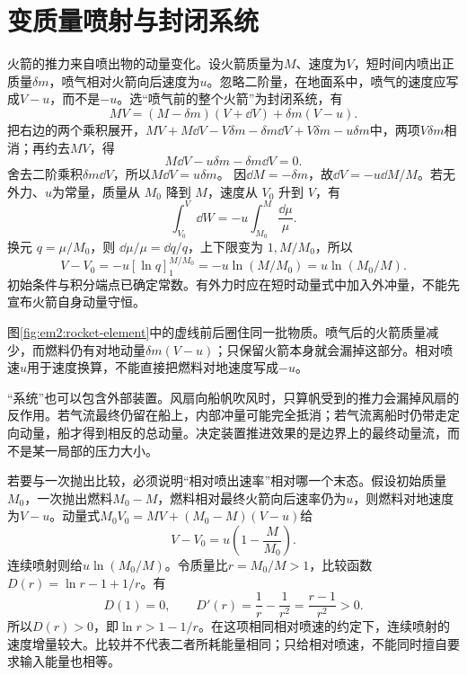 

\section{变质量喷射与封闭系统}

火箭的推力来自喷出物的动量变化。设火箭质量为$M$、速度为$V$，短时间内喷出正质量$\delta m$，喷气相对火箭向后速度为$u$。忽略二阶量，在地面系中，喷气的速度应写成$V-u$，而不是$-u$。选“喷气前的整个火箭”为封闭系统，有
\[MV=(M-\delta m)(V+\dd V)+\delta m(V-u).\]
把右边的两个乘积展开，$MV+M\dd V-V\delta m-\delta m\dd V+V\delta m-u\delta m$中，两项$V\delta m$相消；再约去$MV$，得
\[
M\dd V-u\delta m-\delta m\dd V=0.
\]
舍去二阶乘积$\delta m\dd V$，所以$M\dd V=u\delta m$。
因$\dd M=-\delta m$，故$\dd V=-u\dd M/M$。若无外力、$u$为常量，质量从 $M_0$ 降到 $M$，速度从 $V_0$ 升到 $V$，有
\[
\int_{V_0}^{V}\dd W=-u\int_{M_0}^{M}\frac{\dd\mu}{\mu}.
\]
换元 $q=\mu/M_0$，则 $\dd\mu/\mu=\dd q/q$，上下限变为 $1,M/M_0$，所以
\[
V-V_0=-u[\ln q]_1^{M/M_0}
=-u\ln(M/M_0)=u\ln(M_0/M).
\]
初始条件与积分端点已确定常数。有外力时应在短时动量式中加入外冲量，不能先宣布火箭自身动量守恒。

图\ref{fig:em2:rocket-element}中的虚线前后圈住同一批物质。喷气后的火箭质量减少，而燃料仍有对地动量$\delta m(V-u)$；只保留火箭本身就会漏掉这部分。相对喷速$u$用于速度换算，不能直接把燃料对地速度写成$-u$。


“系统”也可以包含外部装置。风扇向船帆吹风时，只算帆受到的推力会漏掉风扇的反作用。若气流最终仍留在船上，内部冲量可能完全抵消；若气流离船时仍带走定向动量，船才得到相反的总动量。决定装置推进效果的是边界上的最终动量流，而不是某一局部的压力大小。

若要与一次抛出比较，必须说明“相对喷出速率”相对哪一个末态。假设初始质量$M_0$，一次抛出燃料$M_0-M$，燃料相对最终火箭向后速率仍为$u$，则燃料对地速度为$V-u$。动量式$M_0V_0=MV+(M_0-M)(V-u)$给
\[V-V_0=u\left(1-\frac{M}{M_0}\right).\]
连续喷射则给$u\ln(M_0/M)$。令质量比$r=M_0/M>1$，比较函数$D(r)=\ln r-1+1/r$。有
\[
D(1)=0,\qquad D'(r)=\frac1r-\frac1{r^2}=\frac{r-1}{r^2}>0.
\]
所以$D(r)>0$，即$\ln r>1-1/r$。在这项相同相对喷速的约定下，连续喷射的速度增量较大。比较并不代表二者所耗能量相同；只给相对喷速，不能同时擅自要求输入能量也相等。

